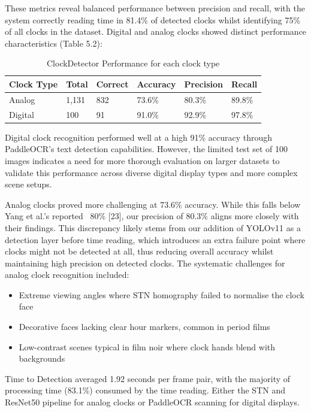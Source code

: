 These metrics reveal balanced performance between precision and recall, with the system correctly reading time in 81.4\% of detected clocks whilst identifying 75\% of all clocks in the dataset. Digital and analog clocks showed distinct performance characteristics (Table 5.2):

\begin{table}[h]
\centering
\caption{ClockDetector Performance for each clock type}
\label{tab:clock-performance}
\begin{tabular}{llllll}
\toprule
\textbf{Clock Type} & \textbf{Total} & \textbf{Correct} & \textbf{Accuracy} & \textbf{Precision} & \textbf{Recall} \\
\midrule
Analog & 1,131 & 832 & 73.6\% & 80.3\% & 89.8\% \\
Digital & 100 & 91 & 91.0\% & 92.9\% & 97.8\% \\
\bottomrule
\end{tabular}
\end{table}

Digital clock recognition performed well at a high 91\% accuracy through PaddleOCR's text detection capabilities. However, the limited test set of 100 images indicates a need for more thorough evaluation on larger datasets to validate this performance across diverse digital display types and more complex scene setups.

Analog clocks proved more challenging at 73.6\% accuracy. While this falls below Yang et al.'s reported ~80\% [23], our precision of 80.3\% aligns more closely with their findings. This discrepancy likely stems from our addition of YOLOv11 as a detection layer before time reading, which introduces an extra failure point where clocks might not be detected at all, thus reducing overall accuracy whilst maintaining high precision on detected clocks. The systematic challenges for analog clock recognition included:
\begin{itemize}
\item Extreme viewing angles where STN homography failed to normalise the clock face
\item Decorative faces lacking clear hour markers, common in period films
\item Low-contrast scenes typical in film noir where clock hands blend with backgrounds
\end{itemize}

Time to Detection averaged 1.92 seconds per frame pair, with the majority of processing time (83.1\%) consumed by the time reading. Either the STN and ResNet50 pipeline for analog clocks or PaddleOCR scanning for digital displays. 

